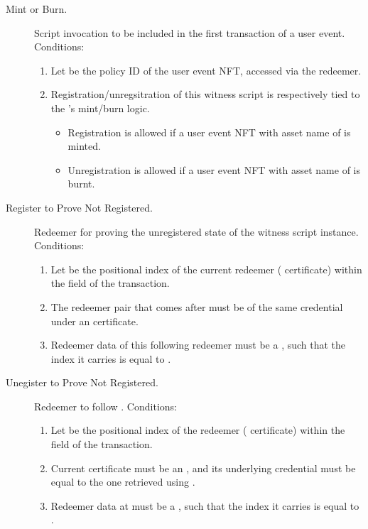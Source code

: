 \documentclass[../midgard.tex]{subfiles}
\begin{document}
\begin{description}
  \item[Mint or Burn.] Script invocation to be included in the first transaction of a user event.
    Conditions:
      \begin{enumerate}
          \item Let  be the policy ID of the user event NFT, accessed via the redeemer.
          \item Registration/unregsitration of this witness script is respectively tied to the 's mint/burn logic. 
              \begin{itemize}
                  \item Registration is allowed if a user event NFT with asset name of  is minted.
                  \item Unregistration is allowed if a user event NFT with asset name of  is burnt.
              \end{itemize}
      \end{enumerate}
  \item[Register to Prove Not Registered.] Redeemer for proving the unregistered state of the witness script instance.
    Conditions:
      \begin{enumerate}
          \item Let  be the positional index of the current redeemer ( certificate) within the  field of the transaction.
          \item The redeemer pair that comes after  must be of the same credential under an  certificate.
          \item Redeemer data of this following redeemer must be a , such that the index it carries is equal to .
      \end{enumerate}
  \item[Unegister to Prove Not Registered.] Redeemer to follow .
    Conditions:
      \begin{enumerate}
          \item Let  be the positional index of the  redeemer ( certificate) within the  field of the transaction.
          \item Current certificate must be an , and its underlying credential must be equal to the one retrieved using .
          \item Redeemer data at  must be a , such that the index it carries is equal to .
      \end{enumerate}
\end{description}
\end{document}
